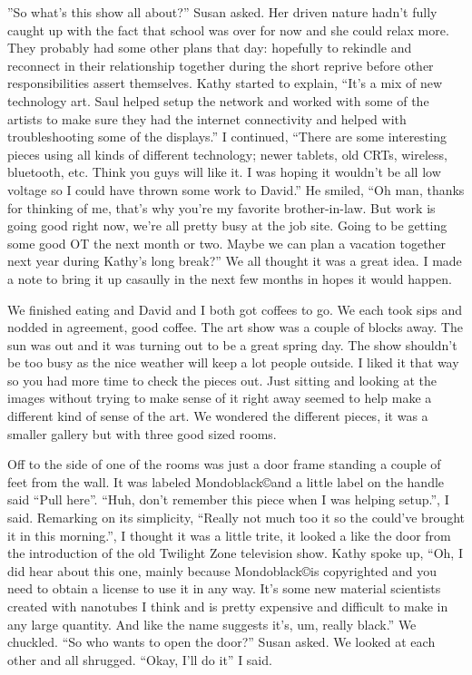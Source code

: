 \documentclass[12pt]{article}
\begin{document}
''So what's this show all about?'' Susan asked. Her driven nature
hadn't fully caught up with the fact that school was over for now
and she could relax more.  They probably had some other plans that
day: hopefully to rekindle and reconnect in their relationship
together during the short reprive before other responsibilities
assert themselves. Kathy started to explain, ``It's a mix of new
technology art. Saul helped setup the network and worked with some
of the artists to make sure they had the internet connectivity and
helped with troubleshooting some of the displays.'' I continued,
``There are some interesting pieces using all kinds of different
technology; newer tablets, old CRTs, wireless, bluetooth, etc.
Think you guys will like it.  I was hoping it wouldn't be all low
voltage so I could have thrown some work to David.''  He smiled,
``Oh man, thanks for thinking of me, that's why you're my favorite
brother-in-law.  But work is going good right now, we're all
pretty busy at the job site.  Going to be getting some good OT the
next month or two. Maybe we can plan a vacation together next year
during Kathy's long break?'' We all thought it was a great idea. I
made a note to bring it up casaully in the next few months in
hopes it would happen. 


We finished eating and David and I both got coffees to go. We each
took sips and nodded in agreement, good coffee. The art show was a
couple of blocks away. The sun was out and it was turning out to
be a great spring day. The show shouldn't be too busy as the nice
weather will keep a lot people outside. I liked it that way so you
had more time to check the pieces out. Just sitting and looking at
the images without trying to make sense of it right away seemed to
help make a different kind of sense of the art. We wondered the
different pieces, it was a smaller gallery but with three good
sized rooms.


Off to the side of one of the rooms was just a door frame standing
a couple of feet from the wall. It was labeled
Mondoblack\copyright and a little label on the handle said ``Pull
here''.  ``Huh, don't remember this piece when I was helping
setup.'', I said. Remarking on its simplicity, ``Really not much
too it so the could've brought it in this morning.'',  I thought
it was a little trite, it looked a like the door from the
introduction of the old Twilight Zone television show. Kathy spoke
up, ``Oh, I did hear about this one, mainly because
Mondoblack\copyright is
copyrighted and you need to obtain a license to use it in any way.
It's some new material scientists created with nanotubes I think
and is pretty expensive and difficult to make in any large
quantity. And like the name suggests it's, um, really black.'' We
chuckled. ``So who wants to open the door?'' Susan asked. We
looked at each other and all shrugged. ``Okay, I'll do it'' I
said. 
\end{document}
